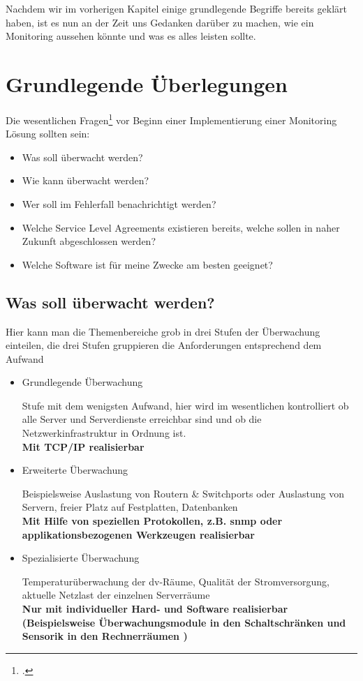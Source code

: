 \documentclass[12pt,a4paper,parskip,listof=totoc,bibliography=totoc]{scrreprt}
\begin{document}
	Nachdem wir im vorherigen Kapitel einige grundlegende Begriffe bereits geklärt haben, ist es nun an der Zeit uns Gedanken darüber zu machen, wie ein Monitoring aussehen könnte und was es alles leisten sollte. 
	\section{Grundlegende Überlegungen}
	Die wesentlichen Fragen\footcite[nach][]{veltnagios1} vor Beginn einer Implementierung einer Monitoring Lösung sollten sein:
	\begin{itemize}
		\item Was soll überwacht werden?
		\item Wie kann überwacht werden?
		\item Wer soll im Fehlerfall benachrichtigt werden?
		\item Welche Service Level Agreements existieren bereits, welche sollen in naher Zukunft abgeschlossen werden?
		\item Welche Software ist für meine Zwecke am besten geeignet?
	\end{itemize}
	\subsection{Was soll überwacht werden?}
	Hier kann man die Themenbereiche grob in drei Stufen der Überwachung einteilen, die drei Stufen gruppieren die Anforderungen entsprechend dem Aufwand
	\begin{itemize}
		\item Grundlegende Überwachung
		
		Stufe mit dem wenigsten Aufwand, hier wird im wesentlichen kontrolliert ob alle Server und Serverdienste erreichbar sind und ob die Netzwerkinfrastruktur in Ordnung ist.\\
		\textbf{Mit TCP/IP realisierbar}
		\item Erweiterte Überwachung
		
		Beispielsweise Auslastung von Routern \& Switchports oder Auslastung von Servern, freier Platz auf Festplatten, Datenbanken\\
		\textbf{Mit Hilfe von speziellen Protokollen, z.B. \acrshort{snmp} oder applikationsbezogenen Werkzeugen realisierbar}
		\item Spezialisierte Überwachung
		
		Temperaturüberwachung der \acrshort{dv}-Räume, Qualität der Stromversorgung, aktuelle Netzlast der einzelnen Serverräume\\
		\textbf{Nur mit individueller Hard- und Software realisierbar (Beispielsweise Überwachungsmodule in den Schaltschränken und Sensorik in den Rechnerräumen )}
	\end{itemize}
\end{document}
